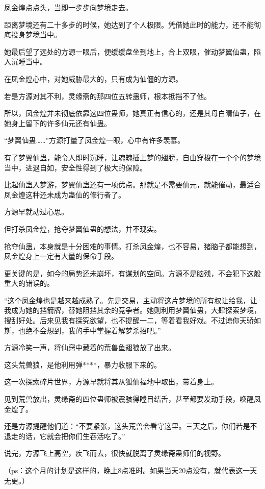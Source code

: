 \begin{this_body}
凤金煌点点头，当即一步步向梦境走去。

距离梦境还有二十多步的时候，她达到了个人极限。凭借她此时的能力，还不能彻底投身梦境当中。

她最后望了远处的方源一眼后，便缓缓盘坐到地上，合上双眼，催动梦翼仙蛊，陷入沉睡当中。

在凤金煌心中，对她威胁最大的，只有成为仙僵的方源。

若是方源对其不利，灵缘斋的那四位五转蛊师，根本抵挡不了他。

所以，凤金煌并未彻底依靠这四位蛊师，她真正有信心的，还是其母白晴仙子，在她身上留下的许多仙元还有仙蛊。

“梦翼仙蛊……”方源打量了凤金煌一眼，心中有许多羡慕。

有了梦翼仙蛊，能令人即时沉睡，让魂魄插上梦的翅膀，自由穿梭在一个个的梦境当中，进退自如，安全性得到了极大的保障。

比起仙蛊入梦游，梦翼仙蛊还有一项优点。那就是不需要仙元，就能催动，最适合凤金煌这种还未成为蛊仙的修行者了。

方源早就动过心思。

但打杀凤金煌，抢夺梦翼仙蛊的想法，并不现实。

抢夺仙蛊，本身就是十分困难的事情。打杀凤金煌，也不容易，猪脑子都能想到，凤金煌身上一定有大量的保命手段。

更关键的是，如今的局势还未崩坏，有谋划的空间。方源不是脑残，不会犯下这般重大的错误的。

“这个凤金煌也是越来越成熟了。先是交易，主动将这片梦境的所有权让给我，让我成为她的挡箭牌，替她阻挡其余的竞争者。她则利用梦翼仙蛊，大肆探索梦境，搜刮好处。后来见我有探究欲望，也不提醒一二，等着看我好戏。不过谅你天骄如斯，也绝不会想到，我的手中掌握着解梦杀招吧。”

方源冷笑一声，将仙窍中藏着的荒兽鱼翅狼放了出来。

这头荒兽狼，是他利用弹****，暴力收服下来的。

这一次探索碎片世界，方源早就将其从狐仙福地中取出，带着身上。

见到荒兽放出，灵缘斋的四位蛊师被震骇得瞠目结舌，甚至都要发动手段，唤醒凤金煌了。

还是方源提醒他们道：“不要紧张，这头荒兽会看守这里。三天之后，你们若是不退走的话，它就会把你们生吞活吃了。”

说完，方源飞上高空，疾飞而去，很快就脱离了灵缘斋蛊师们的视野。

（ps：这个月的计划是这样的，晚上8点准时。如果当天20点没有，就代表这一天无更。）

\end{this_body}

